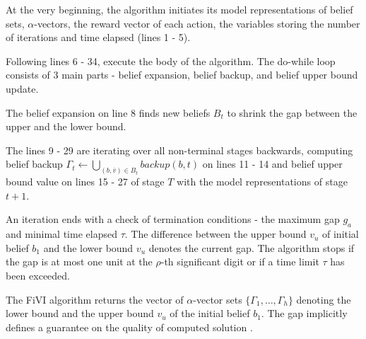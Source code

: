 At the very beginning, the algorithm initiates its model representations of belief sets, $\alpha$-vectors, the reward vector of each action, the variables storing the number of iterations and time elapsed (lines 1 - 5).

Following lines 6 - 34, execute the body of the algorithm. The do-while loop consists of 3 main parts - belief expansion, belief backup, and belief upper bound update.

The belief expansion on line 8 finds new beliefs $B_t$ to shrink the gap between the upper and the lower bound. 

The lines 9 - 29 are iterating over all non-terminal stages backwards, computing belief backup $\Gamma_t \xleftarrow{} \bigcup_{(b, \bar{v}) \in B_t} backup(b, t)$  on lines 11 - 14 and belief upper bound value on lines 15 - 27 of stage $T$ with the model representations of stage $t + 1$.

An iteration ends with a check of termination conditions - the maximum gap $g_a$ and minimal time elapsed $\tau$. The difference between the upper bound $v_u$ of initial belief $b_1$ and the lower bound $v_u$ denotes the current gap. The algorithm stops if the gap is at most one unit at the $\rho$-th significant digit or if a time limit $\tau$ has been exceeded.

The FiVI algorithm returns the vector of $\alpha$-vector sets $\{\Gamma_1, \dots, \Gamma_h\}$ denoting the lower bound and the upper bound $v_u$ of the initial belief $b_1$. The gap implicitly defines a guarantee on the quality of computed solution \cite{Walraven19}.



